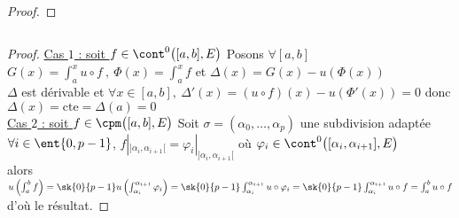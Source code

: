 {\begin{proof}
    \end{proof}
    ${}$ \\ 
    \begin{proof}
    \underline{Cas $1$ : soit $f\in\cont^0 \big( [a,b] ,E \big)$} Posons $\forall[a,b]$\\ $G(x) = \int_a^x u\circ f ~,~ \Phi (x) = \int_a^x f$ 
    et $\Delta (x) = G(x) - u(\Phi (x)) $ \\ $\Delta$ est dérivable et $\forall x\in [a,b] , ~\Delta'(x) = (u\circ f)(x) - u(\Phi'(x)) = 0$ 
    donc $\Delta (x) = \mathrm{cte} = \Delta (a) =0$ \\ \underline{Cas $2$ : soit $f\in\cpm \big( [a,b] ,E \big)$} Soit $\sigma = (\alpha_0 , 
    \dots ,\alpha_p)$ une subdivision adaptée \\$\forall i\in \ent{0,p-1}$, $f|_{]\alpha_i , \alpha_{i+1}[} = 
    \varphi_i|_{]\alpha_i , \alpha_{i+1}[}$ où $\varphi_i \in \cont^0 \big( [\alpha_i , \alpha_{i+1} ],E\big) $\\ alors 
    $u\left( \int_a^b f\right) = \sk{0}{p-1} u\left( \int_{\alpha_i}^{\alpha_{i+1}} \varphi_i \right) = \sk{0}{p-1} 
    \int_{\alpha_i}^{\alpha_{i+1}} u\circ \varphi_i = \sk{0}{p-1} \int_{\alpha_i}^{\alpha_{i+1}} u\circ f =\int_a^b u\circ f$ d'où le résultat.
    \end{proof}
}
